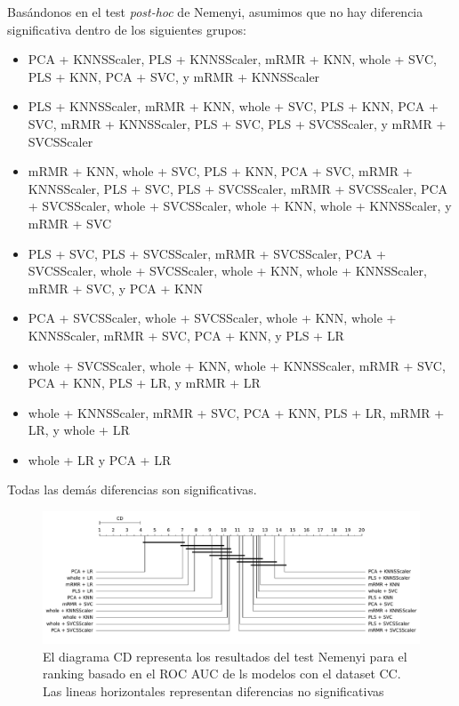 \documentclass[a4paper,oneside,11pt,leqno]{article}
\begin{document}
	Basándonos en el test \textit{post-hoc} de Nemenyi, asumimos que no hay diferencia significativa dentro de los siguientes grupos:
	
	\begin{itemize}
		\item PCA + KNNSScaler, PLS + KNNSScaler, mRMR + KNN, whole + SVC, PLS + KNN, PCA + SVC, y mRMR + KNNSScaler
		
		\item PLS + KNNSScaler, mRMR + KNN, whole + SVC, PLS + KNN, PCA + SVC, mRMR + KNNSScaler, PLS + SVC, PLS + SVCSScaler, y mRMR + SVCSScaler
		
		\item mRMR + KNN, whole + SVC, PLS + KNN, PCA + SVC, mRMR + KNNSScaler, PLS + SVC, PLS + SVCSScaler, mRMR + SVCSScaler, PCA + SVCSScaler, whole + SVCSScaler, whole + KNN, whole + KNNSScaler, y mRMR + SVC
		
		\item PLS + SVC, PLS + SVCSScaler, mRMR + SVCSScaler, PCA + SVCSScaler, whole + SVCSScaler, whole + KNN, whole + KNNSScaler, mRMR + SVC, y PCA + KNN
		
		\item  PCA + SVCSScaler, whole + SVCSScaler, whole + KNN, whole + KNNSScaler, mRMR + SVC, PCA + KNN, y PLS + LR
		
		\item whole + SVCSScaler, whole + KNN, whole + KNNSScaler, mRMR + SVC, PCA + KNN, PLS + LR, y mRMR + LR
		
		\item  whole + KNNSScaler, mRMR + SVC, PCA + KNN, PLS + LR, mRMR + LR, y whole + LR
		
		\item whole + LR y PCA + LR
	\end{itemize}
	
	Todas las demás diferencias son significativas.
	
	\begin{figure}[h]
		\includegraphics[width=\linewidth]{stat_results_cc.pdf}
		\caption{El diagrama CD representa los resultados del test Nemenyi para el ranking basado en el ROC AUC de ls modelos con el dataset CC. Las lineas horizontales representan diferencias no significativas}
		\label{fig:stats_fig_cc}
	\end{figure}
\end{document}
